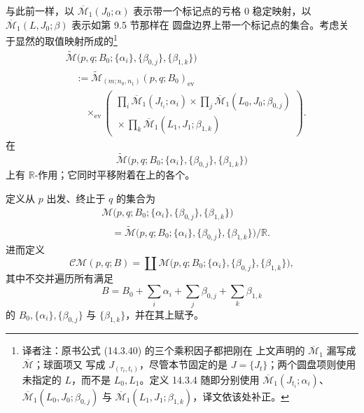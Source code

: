 与此前一样，以 $\overline{\mathcal M}_1(J_0;\alpha)$ 表示带一个标记点的亏格
$0$ 稳定映射，以 $\overline{\mathcal M}_1(L,J_0;\beta)$ 表示如第 9.5 节那样在
圆盘边界上带一个标记点的\termBorderedStableMap{}集合。考虑关于显然的取值映射所成的\termFiberProduct{}\footnote{译者注：原书公式 (14.3.40) 的三个乘积因子都把刚在
上文声明的 $\overline{\mathcal M}_1$ 漏写成 $\overline{\mathcal M}$；球面项又
写成 $J_{(\tau_i,t_i)}$，尽管本节固定的是 $J=\{J_t\}$；两个圆盘项则使用未指定的
$L$，而不是 $L_0,L_1$。定义 14.3.4 随即分别使用
$\overline{\mathcal M}_1(J_{t_i};\alpha_i)$、
$\overline{\mathcal M}_1(L_0,J_0;\beta_{0,j})$ 与
$\overline{\mathcal M}_1(L_1,J_1;\beta_{1,k})$，译文依该处补正。}
\begin{equation}
  \begin{aligned}
  &\widetilde{\mathcal M}
    \bigl(p,q;B_0;\{\alpha_i\},\{\beta_{0,j}\},\{\beta_{1,k}\}\bigr)
  \\
  &\quad:=
  \widetilde{\mathcal M}_{(m;n_0,n_1)}(p,q;B_0)_{\operatorname{ev}}
  \\
  &\qquad\mathbin{\times_{\operatorname{ev}}}
  \left(
    \begin{gathered}
      \displaystyle
      \prod_i\overline{\mathcal M}_1(J_{t_i};\alpha_i)
      \times
      \prod_j\overline{\mathcal M}_1(L_0,J_0;\beta_{0,j})
      \\
      {}\displaystyle\times
      \prod_k\overline{\mathcal M}_1(L_1,J_1;\beta_{1,k})
    \end{gathered}
  \right).
  \end{aligned}
\label{eq:cusp-trajectory-fiber-product}
\end{equation}
在
\[
  \widetilde{\mathcal M}
  \bigl(p,q;B_0;\{\alpha_i\},\{\beta_{0,j}\},\{\beta_{1,k}\}\bigr)
\]
上有 $\mathbb R$-作用；它同时平移附着在\termPrincipalComponent{}上的各个\termBubbleRoot{}。

\begin{definition}
\label{def:unbroken-cusp-trajectories}
定义从 $p$ 出发、终止于 $q$ 的\termCuspTrajectory{}集合为
\[
  \begin{aligned}
  &\mathcal M
  \bigl(p,q;B_0;\{\alpha_i\},\{\beta_{0,j}\},\{\beta_{1,k}\}\bigr)
  \\
  &\quad=
  \widetilde{\mathcal M}
  \bigl(p,q;B_0;\{\alpha_i\},\{\beta_{0,j}\},\{\beta_{1,k}\}\bigr)
  /\mathbb R.
  \end{aligned}
\]
进而定义
\[
  \mathcal{CM}(p,q;B)
  =
  \coprod
  \mathcal M
  \bigl(p,q;B_0;\{\alpha_i\},\{\beta_{0,j}\},\{\beta_{1,k}\}\bigr),
\]
其中不交并遍历所有满足
\[
  B=B_0+\sum_i\alpha_i+\sum_j\beta_{0,j}+\sum_k\beta_{1,k}
\]
的 $B_0,\{\alpha_i\},\{\beta_{0,j}\}$ 与 $\{\beta_{1,k}\}$，并在其上赋予\termStableMapTopology{}。
\end{definition}

